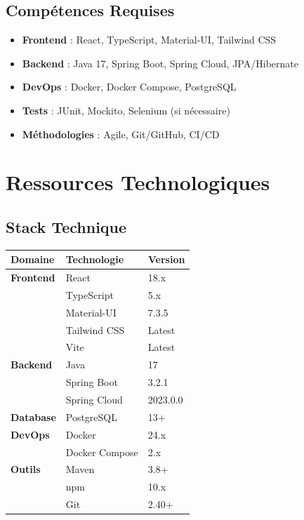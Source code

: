 \documentclass[12pt,a4paper,french]{report}
\begin{document}
\subsection{Compétences Requises}

\begin{itemize}
    \item \textbf{Frontend} : React, TypeScript, Material-UI, Tailwind CSS
    \item \textbf{Backend} : Java 17, Spring Boot, Spring Cloud, JPA/Hibernate
    \item \textbf{DevOps} : Docker, Docker Compose, PostgreSQL
    \item \textbf{Tests} : JUnit, Mockito, Selenium (si nécessaire)
    \item \textbf{Méthodologies} : Agile, Git/GitHub, CI/CD
\end{itemize}

\section{Ressources Technologiques}

\subsection{Stack Technique}

\begin{table}[H]
\centering
\begin{tabularx}{\textwidth}{|l|l|l|}
\hline
\rowcolor{LightGray}
\textbf{Domaine} & \textbf{Technologie} & \textbf{Version} \\
\hline
\textbf{Frontend} & React & 18.x \\
\hline
 & TypeScript & 5.x \\
\hline
 & Material-UI & 7.3.5 \\
\hline
 & Tailwind CSS & Latest \\
\hline
 & Vite & Latest \\
\hline
\textbf{Backend} & Java & 17 \\
\hline
 & Spring Boot & 3.2.1 \\
\hline
 & Spring Cloud & 2023.0.0 \\
\hline
\textbf{Database} & PostgreSQL & 13+ \\
\hline
\textbf{DevOps} & Docker & 24.x \\
\hline
 & Docker Compose & 2.x \\
\hline
\textbf{Outils} & Maven & 3.8+ \\
\hline
 & npm & 10.x \\
\hline
 & Git & 2.40+ \\
\hline
\end{tabularx}
\end{table}
\end{document}

